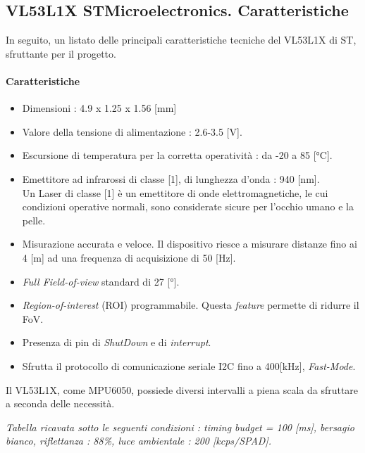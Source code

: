 \documentclass[11pt]{report}
\begin{document}
\subsection{VL53L1X STMicroelectronics. Caratteristiche}
In seguito, un listato delle principali caratteristiche tecniche del VL53L1X di ST, sfruttante per il progetto.\\
\paragraph{Caratteristiche}
\begin{itemize}
\item Dimensioni : 4.9 x 1.25 x 1.56 [mm]
\item Valore della tensione di alimentazione : 2.6-3.5 [V].
\item Escursione di temperatura per la corretta operatività : da -20 a 85 [°C].
\item Emettitore ad infrarossi di classe [1], di lunghezza d'onda : 940 [nm]. \\Un Laser di classe [1] è un emettitore di onde elettromagnetiche, le cui condizioni operative normali, sono considerate sicure per l'occhio umano e la pelle.
\item Misurazione accurata e veloce. Il dispositivo riesce a misurare distanze fino ai 4 [m] ad una frequenza di acquisizione di 50 [Hz].
\item \textit{Full Field-of-view} standard di 27 [°].
\item \textit{Region-of-interest} (ROI) programmabile. Questa \textit{feature} permette di ridurre il FoV.
\item Presenza di pin di \textit{ShutDown} e di \textit{interrupt}.
\item Sfrutta il protocollo di comunicazione seriale I2C fino a 400[kHz], \textit{Fast-Mode}.
\end{itemize}
Il VL53L1X, come MPU6050, possiede diversi intervalli a piena scala da sfruttare a seconda delle necessità.
\begin{table}[H]
    \centering
    \caption{\textit{Distance mode} del VL53L1X STMicroelectronics.}
    \label{tab: tabella}
\end{table}
\begin{center}
    \footnotesize \textit{Tabella ricavata sotto le seguenti condizioni : \textit{timing budget} = 100 [ms], bersagio bianco, riflettanza : 88\%, luce ambientale : 200 [kcps/SPAD].}
\end{center}
\end{document}
